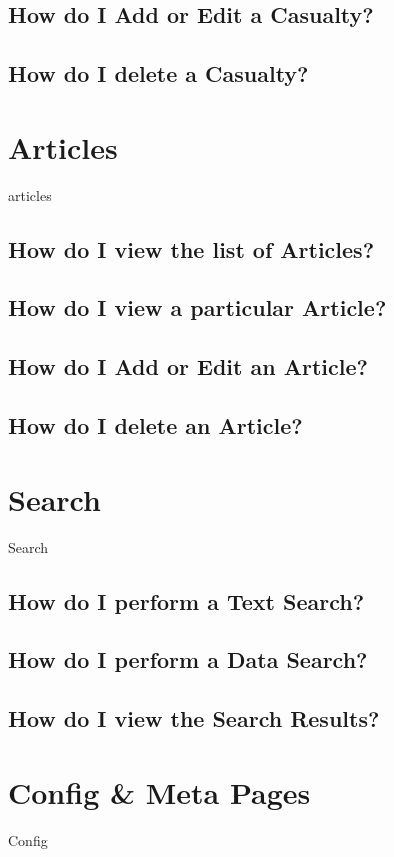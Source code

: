 \documentclass[12pt]{article}
\begin{document}
\subsection{How do I Add or Edit a Casualty?}\label{ssec:edit_casualty}
\subsection{How do I delete a Casualty?}\label{ssec:delete_casualty}


\section{Articles}\label{sec:articles}
articles
\subsection{How do I view the list of Articles?}
\subsection{How do I view a particular Article?}
\subsection{How do I Add or Edit an Article?}
\subsection{How do I delete an Article?}

\section{Search}\label{sec:search}
Search
\subsection{How do I perform a Text Search?}
\subsection{How do I perform a Data Search?}
\subsection{How do I view the Search Results?}

\section{Config \& Meta Pages}\label{sec:config}
Config
\end{document}

